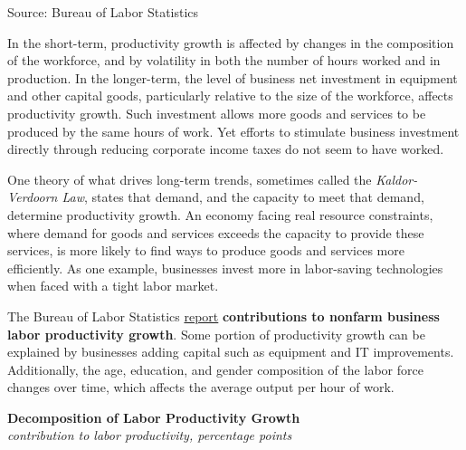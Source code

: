 \documentclass{report}
\newcommand{\tbllink}[1]{\href{https://raw.githubusercontent.com/bdecon/US-chartbook/master/chartbook/data/#1}{\faTable}}
\begin{document}
{\begin{minipage}{0.76\textwidth}
\footnotesize{Source: Bureau of Labor Statistics} \hfill \tbllink{lprod.csv}
\vspace{1mm}

\small In the short-term, productivity growth is affected by changes in the composition of the workforce, and by volatility in both the number of hours worked and in production. In the longer-term, the level of business net investment in equipment and other capital goods, particularly relative to the size of the workforce, affects productivity growth. Such investment allows more goods and services to be produced by the same hours of work. Yet efforts to stimulate business investment directly through reducing corporate income taxes do not seem to have worked. 

One theory of what drives long-term trends, sometimes called the \textit{Kaldor-Verdoorn Law}, states that demand, and the capacity to meet that demand, determine productivity growth. An economy facing real resource constraints, where demand for goods and services exceeds the capacity to provide these services, is more likely to find ways to produce goods and services more efficiently. As one example, businesses invest more in labor-saving technologies when faced with a tight labor market. 
\end{minipage}
\newpage
\begin{minipage}{0.76\textwidth} 
\small The Bureau of Labor Statistics \href{https://www.bls.gov/news.release/prod3.nr0.htm}{report} \textbf{contributions to nonfarm business labor productivity growth}. Some portion of productivity growth can be explained by businesses adding capital such as equipment and IT improvements. Additionally, the age, education, and gender composition of the labor force changes over time, which affects the average output per hour of work. 


\vspace{2mm}

\normalsize \textbf{Decomposition of Labor Productivity Growth}\\
\footnotesize{\textit{contribution to labor productivity, percentage points}}
\vspace{4.85cm}


\end{minipage}}
\end{document}
